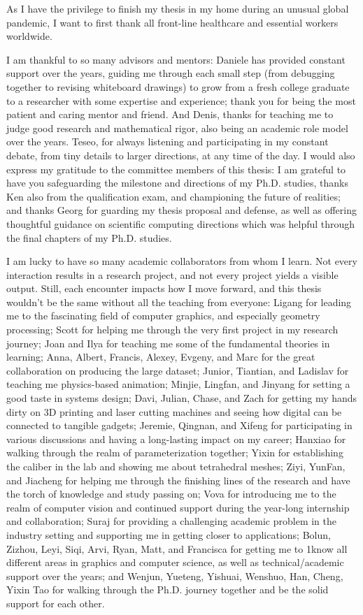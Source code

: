 As I have the privilege to finish my thesis in my home during an unusual global pandemic, I want to first thank all front-line healthcare and essential workers worldwide.

I am thankful to so many advisors and mentors: Daniele has provided constant support over the years, guiding me through each small step (from debugging together to revising whiteboard drawings) to grow from a fresh college graduate to a researcher with some expertise and experience; thank you for being the most patient and caring mentor and friend. 
And Denis, thanks for teaching me to judge good research and mathematical rigor, also being an academic role model over the years. 
Teseo, for always listening and participating in my constant debate, from tiny details to larger directions, at any time of the day.
I would also express my gratitude to the committee members of this thesis: I am grateful to have you safeguarding the milestone and directions of my Ph.D. studies, thanks Ken also from the qualification exam, and championing the future of realities; and thanks Georg for guarding my thesis proposal and defense, as well as offering thoughtful guidance on scientific computing directions which was helpful through the final chapters of my Ph.D. studies.

I am lucky to have so many academic collaborators from whom I learn. Not every interaction results in a research project, and not every project yields a visible output. Still, each encounter impacts how I move forward, and this thesis wouldn't be the same without all the teaching from everyone:
Ligang for leading me to the fascinating field of computer graphics, and especially geometry processing;
Scott for helping me through the very first project in my research journey;
Joan and Ilya for teaching me some of the fundamental theories in learning;
Anna, Albert, Francis, Alexey, Evgeny, and Marc for the great collaboration on producing the large dataset;
Junior, Tiantian, and Ladislav for teaching me physics-based animation;
Minjie, Lingfan, and Jinyang for setting a good taste in systems design;
Davi, Julian, Chase, and Zach for getting my hands dirty on 3D printing and laser cutting machines and seeing how digital can be connected to tangible gadgets;
Jeremie, Qingnan, and Xifeng for participating in various discussions and having a long-lasting impact on my career;
Hanxiao for walking through the realm of parameterization together;
Yixin for establishing the caliber in the lab and showing me about tetrahedral meshes;
Ziyi, YunFan, and Jiacheng for helping me through the finishing lines of the research and have the torch of knowledge and study passing on;
Vova for introducing me to the realm of computer vision and continued support during the year-long internship and collaboration;
Suraj for providing a challenging academic problem in the industry setting and supporting me in getting closer to applications;
Bolun, Zizhou, Leyi, Siqi, Arvi, Ryan, Matt, and Francisca for getting me to 1know all different areas in graphics and computer science, as well as technical/academic support over the years; and Wenjun, Yueteng, Yishuai, Wenshuo, Han, Cheng, Yixin Tao for walking through the Ph.D. journey together and be the solid support for each other.

